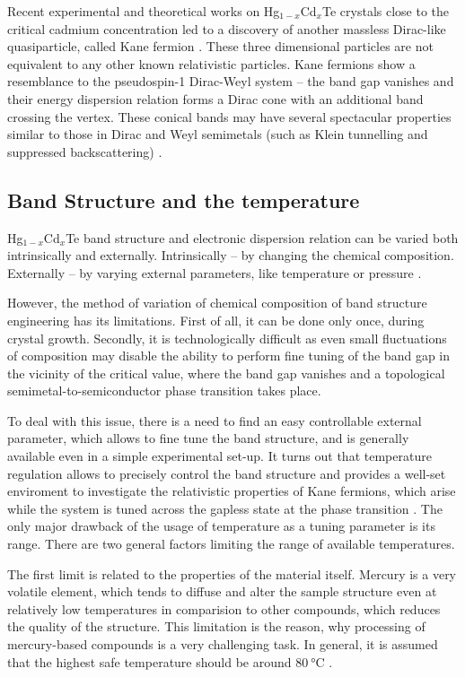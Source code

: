 \documentclass[titlepage,a4paper]{book}
\newcommand{\wciecie}{\quad\phantom{v}}
\begin{document}
Recent experimental \cite{Orlita_MCT} and theoretical \cite{Malcolm_MCT} works on Hg$_{1-x}$Cd$_x$Te crystals close to the critical cadmium concentration led to a discovery of another massless Dirac-like quasiparticle, called Kane fermion \cite{Orlita_MCT}. These three dimensional particles are not equivalent to any other known relativistic particles. Kane fermions show a resemblance to the pseudospin-1 Dirac-Weyl system \cite{Malcolm_MCT} -- the band gap vanishes \cite{Weiler_MCT} and their energy dispersion relation forms a Dirac cone with an additional band crossing the vertex. These conical bands may have several spectacular properties similar to those in Dirac and Weyl semimetals (such as Klein tunnelling and suppressed backscattering) \cite{Orlita_MCT}. 

\subsection{Band Structure and the temperature}
\wciecie
Hg$_{1-x}$Cd$_x$Te band structure and electronic dispersion relation can be varied both intrinsically and externally. Intrinsically -- by changing the chemical composition. Externally -- by varying external parameters, like temperature \cite{Capper_MCT} or pressure \cite{Krishtopenko_pressure}. 

However, the method of variation of chemical composition of band structure engineering has its limitations. First of all, it can be done only once, during crystal growth. Secondly, it is technologically difficult as even small fluctuations of composition may disable the ability to perform fine tuning of the band gap in the vicinity of the critical value, where the band gap vanishes and a topological semimetal-to-semiconductor phase transition takes place.

To deal with this issue, there is a need to find an easy controllable external parameter, which allows to fine tune the band structure, and is generally available even in a simple experimental set-up. It turns out that temperature regulation allows to precisely control the band structure and provides a well-set enviroment to investigate the relativistic properties of Kane fermions, which arise while the system is tuned across the gapless state at the phase transition \cite{Teppe_MCT}. The only major drawback of the usage of temperature as a tuning parameter is its range. There are two general factors limiting the range of available temperatures. 

The first limit is related to the properties of the material itself. Mercury is a very volatile element, which tends to diffuse and alter the sample structure even at relatively low temperatures in comparision to other compounds, which reduces the quality of the structure. This limitation is the reason, why processing of mercury-based compounds is a very challenging task. In general, it is assumed that the highest safe temperature should be around $\SI{80}{\degreeCelsius}$ \cite{Daumer_MCT_temperature}.
\end{document}
